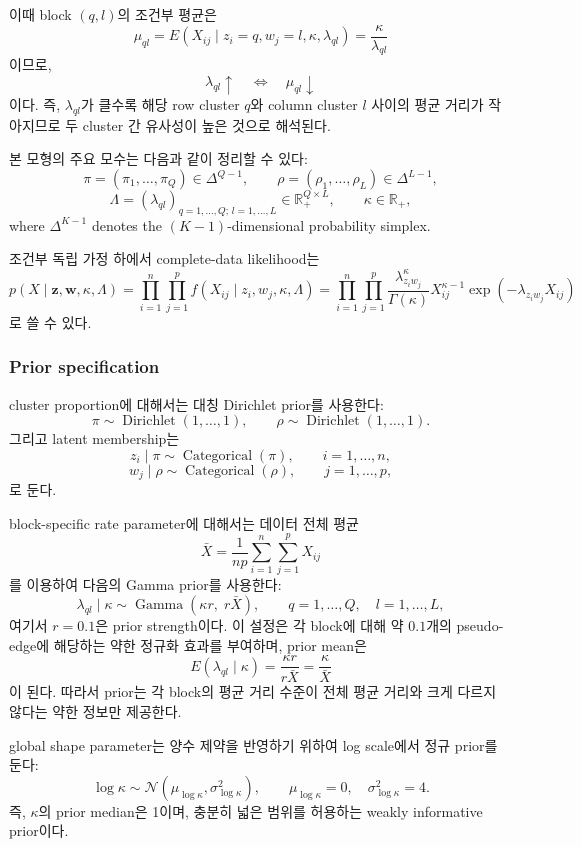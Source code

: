 \documentclass[A4paper,11pt]{article}
\begin{document}
이때 block $(q,l)$의 조건부 평균은
\[
\mu_{ql}
=
E(X_{ij}\mid z_i=q,w_j=l,\kappa,\lambda_{ql})
=
\frac{\kappa}{\lambda_{ql}}
\]
이므로,
\[
\lambda_{ql}\uparrow
\quad\Longleftrightarrow\quad
\mu_{ql}\downarrow
\]
이다. 즉, $\lambda_{ql}$가 클수록 해당 row cluster $q$와 column cluster $l$ 사이의 평균 거리가 작아지므로 두 cluster 간 유사성이 높은 것으로 해석된다.

본 모형의 주요 모수는 다음과 같이 정리할 수 있다:
\[
\pi = (\pi_1,\ldots,\pi_Q) \in \Delta^{Q-1},
\qquad
\rho = (\rho_1,\ldots,\rho_L) \in \Delta^{L-1},
\]
\[
\Lambda = (\lambda_{ql})_{q=1,\ldots,Q;\,l=1,\ldots,L}\in\mathbb{R}_{+}^{Q\times L},
\qquad
\kappa \in \mathbb{R}_{+},
\]
where $\Delta^{K-1}$ denotes the $(K-1)$-dimensional probability simplex.

조건부 독립 가정 하에서 complete-data likelihood는
\[
p(X\mid \mathbf{z},\mathbf{w},\kappa,\Lambda)
=
\prod_{i=1}^{n}\prod_{j=1}^{p}
f(X_{ij}\mid z_i,w_j,\kappa,\Lambda)
=
\prod_{i=1}^{n}\prod_{j=1}^{p}
\frac{\lambda_{z_iw_j}^{\kappa}}{\Gamma(\kappa)}
X_{ij}^{\kappa-1}
\exp(-\lambda_{z_iw_j}X_{ij})
\]
로 쓸 수 있다.

\subsubsection{Prior specification}

cluster proportion에 대해서는 대칭 Dirichlet prior를 사용한다:
\[
\pi \sim \operatorname{Dirichlet}(1,\ldots,1),
\qquad
\rho \sim \operatorname{Dirichlet}(1,\ldots,1).
\]
그리고 latent membership는
\[
z_i\mid \pi \sim \operatorname{Categorical}(\pi),
\qquad i=1,\ldots,n,
\]
\[
w_j\mid \rho \sim \operatorname{Categorical}(\rho),
\qquad j=1,\ldots,p,
\]
로 둔다.

block-specific rate parameter에 대해서는 데이터 전체 평균
\[
\bar X = \frac{1}{np}\sum_{i=1}^{n}\sum_{j=1}^{p}X_{ij}
\]
를 이용하여 다음의 Gamma prior를 사용한다:
\[
\lambda_{ql}\mid \kappa
\sim
\operatorname{Gamma}(\kappa r,\; r\bar X),
\qquad q=1,\ldots,Q,\quad l=1,\ldots,L,
\]
여기서 $r=0.1$은 prior strength이다. 이 설정은 각 block에 대해 약 $0.1$개의 pseudo-edge에 해당하는 약한 정규화 효과를 부여하며, prior mean은
\[
E(\lambda_{ql}\mid \kappa)=\frac{\kappa r}{r\bar X}=\frac{\kappa}{\bar X}
\]
이 된다. 따라서 prior는 각 block의 평균 거리 수준이 전체 평균 거리와 크게 다르지 않다는 약한 정보만 제공한다.

global shape parameter는 양수 제약을 반영하기 위하여 log scale에서 정규 prior를 둔다:
\[
\log \kappa \sim \mathcal{N}(\mu_{\log\kappa},\sigma_{\log\kappa}^{2}),
\qquad
\mu_{\log\kappa}=0,\quad
\sigma_{\log\kappa}^{2}=4.
\]
즉, $\kappa$의 prior median은 1이며, 충분히 넓은 범위를 허용하는 weakly informative prior이다.
\end{document}
